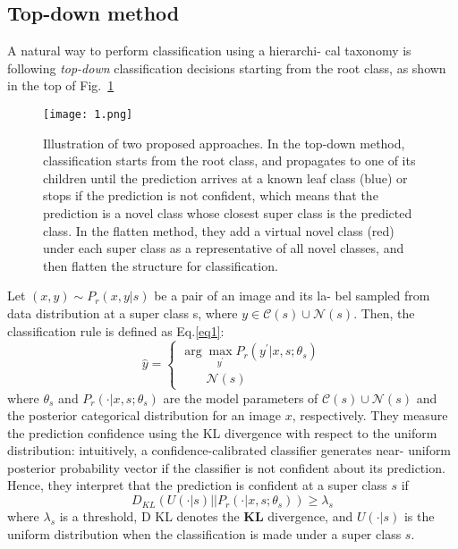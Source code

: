 \documentclass[10pt,twocolumn,letterpaper]{article}
\begin{document}
\subsection{Top-down method}
A natural way to perform classification using a hierarchi-
cal taxonomy is following \textit{top-down} classification decisions
starting from the root class, as shown in the top of Fig.~\ref{fig1}
\begin{figure}
	\centering
	\texttt{[image: 1.png]}
	\caption{Illustration of two proposed approaches. In the
		top-down method, classification starts from the root class,
		and propagates to one of its children until the prediction
		arrives at a known leaf class (blue) or stops if the prediction
		is not confident, which means that the prediction is a novel
		class whose closest super class is the predicted class. In the
		flatten method, they add a virtual novel class (red) under each
		super class as a representative of all novel classes, and then
		flatten the structure for classification.}
	\label{fig1}
\end{figure}
Let $\left(x,y\right) \sim P_r\left(x,y|s\right)$ be a pair of an image and its la-
bel sampled from data distribution at a super class s, where $y \in \mathcal{C}\left(s\right)\cup \mathcal{N}\left(s\right)$. Then, the classification rule is defined as Eq.\ref{eq1}:
\begin{equation}
\hat{y}=
\left\{
\begin{array}{lr}
\arg\max\limits_{y^\prime} P_r\left(y^\prime|x,s;\theta_s\right) \\
\qquad \mathcal{N}\left(s\right) 
\end{array}
\right.
\label{eq1}
\end{equation}
where $\theta_s$ and $P_r\left(\cdot|x,s;\theta_s\right)$ are the model parameters of
$\mathcal{C}\left(s\right)\cup \mathcal{N}\left(s\right)$ and the posterior categorical distribution for
an image $x$, respectively. They measure the prediction confidence using
the KL divergence with respect to the uniform distribution:
intuitively, a confidence-calibrated classifier generates near-
uniform posterior probability vector if the classifier is not
confident about its prediction. Hence, they interpret that the
prediction is confident at a super class $s$ if
\begin{equation}
	D_{KL}\left(U\left(\cdot|s\right)||P_r\left(\cdot|x,s;\theta_s\right)\right) \geq \lambda_s
\end{equation}
where $\lambda_s$ is a threshold, D KL denotes the \textbf{KL} divergence,
and $U\left(\cdot|s\right)$ is the uniform distribution when the classification is made under a super class $s$.



\end{document}
